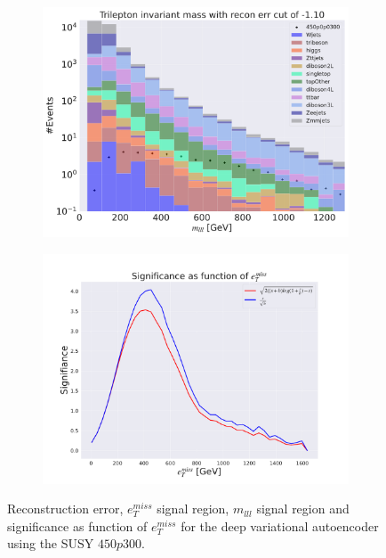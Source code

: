 \begin{figure}[H]
    \hfill
    \begin{subfigure}{.49\textwidth}
        \includegraphics[width=\textwidth]{Figures/VAE_testing/big/3lep/b_data_recon_big_rm3_feats_sig_450p0p0300_mlll_recon_errcut_-1.10.pdf}
        \caption{}
        \label{fig:VAE_3lep_big_mlll_450}
    \end{subfigure}
    \hfill   
    \begin{subfigure}{.49\textwidth}
        \includegraphics[width=\textwidth]{Figures/VAE_testing/big/3lep/significance_etmiss_450p0p0300_-1.0969148715571329.pdf}
        \caption{}
        \label{fig:VAE_3lep_big_signi_450}
    \end{subfigure}
    \hfill      
    \caption[3lep deep network | $450p300$ | VAE]{Reconstruction error, $e_T^{miss}$ signal region, $m_{lll}$ signal region and significance as function of 
    $e_T^{miss}$ for the deep variational autoencoder using the SUSY $450p300$.}
    \label{fig:VAE_3lep_big_rec_sig_signi_450}
\end{figure}

